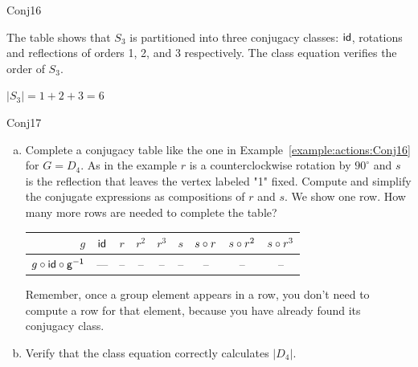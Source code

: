 \begin {example}{Conj16}

The table shows that $S_3$ is partitioned into  three conjugacy classes: $\sf{id}$, rotations and reflections of orders 1, 2, and 3 respectively.  The class equation verifies the order of $S_3$.

$|S_3|=1+2+3=6$
\end{example}

\begin {exercise}{Conj17}
\begin {enumerate}[(a)]
\item Complete a conjugacy table like the one in  Example~\ref{example:actions:Conj16} for $G=D_4$. As in the example $r$ is a counterclockwise rotation by  $90^{\circ}$ and $s$ is the reflection that leaves the vertex labeled "1" fixed. Compute and simplify the conjugate expressions as compositions of $r$ and $s$. We show one row.  How many more rows are needed to complete the table?

\begin{center}

\begin{tabular}{ |r| c | c |c |c |c |c | c|c |} \hline
  $g$ &$\sf{id}$ & $r$ &$r^2$ &$r^3$ & $s$ &$s\circ r$ & $s\circ r ^2$ & $s\circ r^3$\\ \hline
  $g\circ \sf{id}\circ g^{-1}$ &--- & -- & -- &-- &--&--&--&-- \\
\end{tabular}
\end{center}

 Remember, once a group element appears in a row, you don't need to compute a row for that element, because you have already found its conjugacy class.
\item Verify that the class equation correctly calculates $|D_4|$.
\end{enumerate}
\end{exercise}

